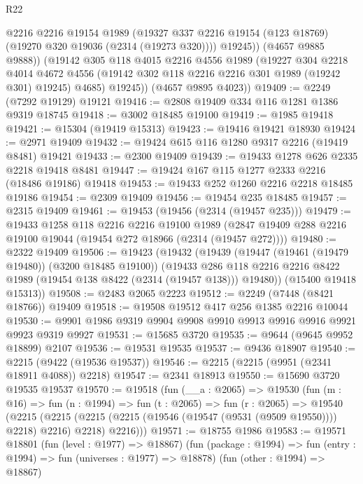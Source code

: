 \begin{lexlean}{R22}
\begin{coremodule}
              @2216
              @2216
              @19154
              @1989
              (@19327 @337 @2216 @19154 (@123 @18769) (@19270 @320 @19036 (@2314 (@19273 @320))))
              @19245))
          (@4657 @9885 @9888))
        (@19142
          @305
          @118
          @4015
          @2216
          @4556
          @1989
          (@19227
            @304
            @2218
            @4014
            @4672
            @4556
            (@19142 @302 @118 @2216 @2216 @301 @1989 (@19242 @301) @19245)
            @4685)
          @19245))
      (@4657 @9895 @4023))
@19409 := @2249 (@7292 @19129) @19121
@19416 := @2808 @19409 @334 @116 @1281 @1386 @9319 @18745
@19418 := @3002 @18485 @19100
@19419 := @1985 @19418
@19421 := @15304 (@19419 @15313)
@19423 := @19416 @19421 @18930
@19424 := @2971 @19409
@19432 := @19424 @615 @116 @1280 @9317 @2216 (@19419 @8481) @19421
@19433 := @2300 @19409
@19439 := @19433 @1278 @626 @2335 @2218 @19418 @8481
@19447 := @19424 @167 @115 @1277 @2333 @2216 (@18486 @19186) @19418
@19453 := @19433 @252 @1260 @2216 @2218 @18485 @19186
@19454 := @2309 @19409
@19456 := @19454 @235 @18485
@19457 := @2315 @19409
@19461 := @19453 (@19456 (@2314 (@19457 @235)))
@19479 := @19433
    @1258
    @118
    @2216
    @2216
    @19100
    @1989
    (@2847 @19409 @288 @2216 @19100 @19044 (@19454 @272 @18966 (@2314 (@19457 @272))))
@19480 := @2322 @19409
@19506 := @19423
    (@19432
      (@19439
        (@19447 (@19461 (@19479 @19480)) (@3200 @18485 @19100))
        (@19433 @286 @118 @2216 @2216 @8422 @1989 (@19454 @138 @8422 (@2314 (@19457 @138))) @19480))
      (@15400 @19418 @15313))
@19508 := @2483 @2065 @2223
@19512 := @2249 (@7448 (@8421 @18766)) @19409
@19518 := @19508 @19512 @417 @256 @1385 @2216 @10044
@19530 := @9901 @1986 @9319 @9904 @9908 @9910 @9913 @9916 @9916 @9921 @9923 @9319 @9927
@19531 := @15685 @3720
@19535 := @9644 (@9645 @9952 @18899) @2107
@19536 := @19531 @19535
@19537 := @9436 @18907
@19540 := @2215 (@9422 (@19536 @19537))
@19546 := @2215 (@2215 (@9951 (@2341 @18911 @4088)) @2218)
@19547 := @2341 @18913
@19550 := @15690 @3720 @19535 @19537
@19570 := @19518
    (fun (__a : @2065) =>
    @19530
      (fun (m : @16) =>
      fun (n : @1994) =>
      fun (t : @2065) =>
      fun (r : @2065) =>
      @19540
        (@2215
          (@2215 (@2215 (@2215 (@19546 (@19547 (@9531 (@9509 @19550)))) @2218) @2216) @2218)
          @2216)))
@19571 := @18755 @1986
@19583 := @19571
    @18801
    (fun (level : @1977) => @18867)
    (fun (package : @1994) => fun (entry : @1994) => fun (universes : @1977) => @18878)
    (fun (other : @1994) => @18867)

\end{coremodule}
\end{lexlean}
